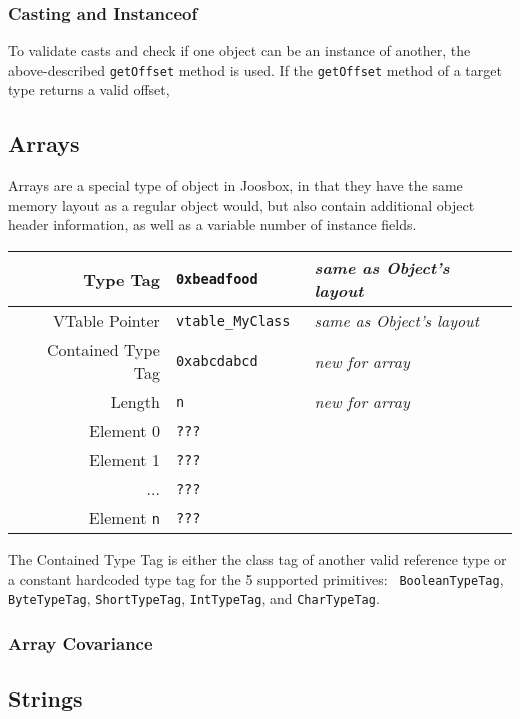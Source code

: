 \documentclass[letterpaper]{article}
\begin{document}
  \subsubsection{Casting and Instanceof}

  To validate casts and check if one object can be an instance of another,
  the above-described {\tt getOffset} method is used. If the {\tt getOffset} method
  of a target type returns a valid offset, %

  \subsection{Arrays}

  Arrays are a special type of object in Joosbox, in that they have the same
  memory layout as a regular object would, but also contain additional object
  header information, as well as a variable number of instance fields.

  \begin{center}
  \begin{tabular}{| r | l | l | }
    \hline
    Type Tag & {\tt 0xbeadfood } & {\em same as Object's layout} \\ \hline
    VTable Pointer & {\tt vtable\_MyClass } & {\em same as Object's layout} \\ \hline
    Contained Type Tag & {\tt 0xabcdabcd } & {\em new for array} \\ \hline
    Length & {\tt n } & {\em new for array} \\ \hline
    Element 0 & {\tt ??? } \\ 
    Element 1 & {\tt ??? } \\ 
    ... & {\tt ??? } \\ 
    Element {\tt n} & {\tt ??? } \\ \hline
  \end{tabular}
\end{center}

  The Contained Type Tag is either the class tag of another valid reference type
  or a constant hardcoded type tag for the 5 supported primitives: {\tt
  BooleanTypeTag}, {\tt ByteTypeTag}, {\tt ShortTypeTag}, {\tt IntTypeTag}, and
  {\tt CharTypeTag}.

  \subsubsection{Array Covariance}



  \subsection{Strings}
\end{document}
